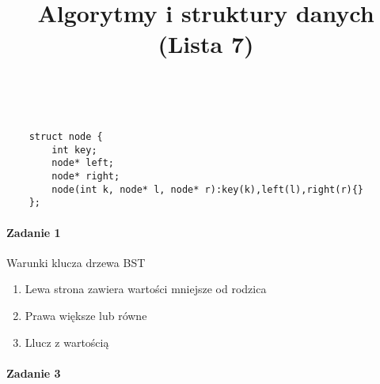 \documentclass[18pt]{extarticle}
\begin{document}
\large
{}\selectfont

\title{Algorytmy i struktury danych (Lista 7)}
\date{}
\maketitle

 \\

\begin{lstlisting}
    struct node {
        int key;
        node* left;
        node* right;
        node(int k, node* l, node* r):key(k),left(l),right(r){}
    };
\end{lstlisting}
\paragraph{Zadanie 1} Warunki klucza drzewa BST
\begin{enumerate}
    \item Lewa strona zawiera wartości mniejsze od rodzica
    \item Prawa większe lub równe
    \item Llucz z wartością
\end{enumerate}
\paragraph{Zadanie 3} 
\end{document}
